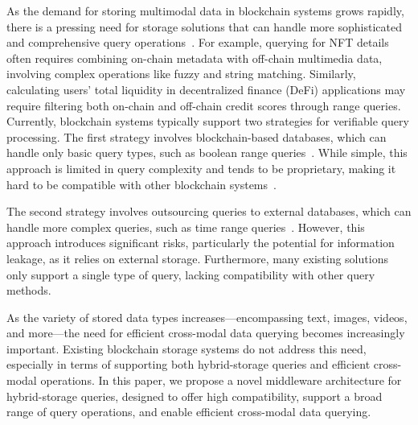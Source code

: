 As the demand for storing multimodal data in blockchain systems grows rapidly, there is a pressing need for storage solutions that can handle more sophisticated and comprehensive query operations~\cite{V2FS2024}. For example, querying for NFT details often requires combining on-chain metadata with off-chain multimedia data, involving complex operations like fuzzy and string matching. Similarly, calculating users' total liquidity in decentralized finance (DeFi) applications may require filtering both on-chain and off-chain credit scores through range queries.
Currently, blockchain systems typically support two strategies for verifiable query processing. 
The first strategy involves blockchain-based databases, which can handle only basic query types, such as boolean range queries~\cite{chang2023anole,wang2022vchain+,xu2019vchain}. 
While simple, this approach is limited in query complexity and tends to be proprietary, making it hard to be compatible with other blockchain systems~\cite{V2FS2024}. 

The second strategy involves outsourcing queries to external databases, which can handle more complex queries, such as time range queries~\cite{antonopoulos2021sql,peng2020falcondb,yang2020ledgerdb,yue2022glassdb,zhang2017vsql,zhang2015integridb}. 
However, this approach introduces significant risks, particularly the potential for information leakage, as it relies on external storage. 
Furthermore, many existing solutions only support a single type of query, lacking compatibility with other query methods. 


As the variety of stored data types increases—encompassing text, images, videos, and more—the need for efficient cross-modal data querying becomes increasingly important. 
Existing blockchain storage systems do not address this need, especially in terms of supporting both hybrid-storage queries and efficient cross-modal operations. 
In this paper, we propose a novel middleware architecture for hybrid-storage queries, designed to offer high compatibility, support a broad range of query operations, and enable efficient cross-modal data querying.


